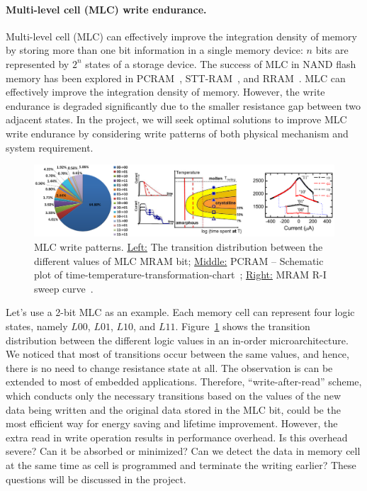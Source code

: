\paragraph{Multi-level cell (MLC) write endurance.} Multi-level cell (MLC) can effectively improve the integration density of memory by storing more than one bit information in a single memory device: $n$ bits are represented by  $2^n$ states of a storage device. The success of MLC in NAND flash memory has been explored in PCRAM~\cite{Raoux08,Bedeschi09}, STT-RAM~\cite{Lou08}, and RRAM~\cite{Baek05}. MLC can effectively improve the integration density of memory. However, the write endurance is degraded significantly due to the smaller resistance gap between two adjacent states. In the project, we will seek optimal solutions to improve MLC write endurance by considering write patterns of both physical mechanism and system requirement.

\begin{figure}
\centering
\vspace{-10pt}
\includegraphics[width=1.0\textwidth]{./figure/4_mlc.pdf}
\vspace{-10pt}
\caption{MLC write patterns. \underline{Left:} The transition distribution between the different values of MLC MRAM bit; \underline{Middle:} PCRAM -- Schematic plot of time-temperature-transformation-chart~\cite{Nirschl07}; \underline{Right:} MRAM R-I sweep curve~\cite{Lou08}.}
\label{mlc}
\vspace{-10pt}
\end{figure}

Let's use a 2-bit MLC as an example. Each memory cell can represent four logic states, namely $L00$, $L01$, $L10$, and $L11$.  Figure~\ref{mlc} shows the transition distribution between the different logic values in an in-order microarchitecture. We noticed that most of transitions occur between the same values, and hence, there is no need to change resistance state at all. The observation is can be extended to most of embedded applications. Therefore, ``write-after-read'' scheme, which conducts only the necessary transitions based on the values of the new data being written and the original data stored in the MLC bit, could be the most efficient way for energy saving and lifetime improvement. However, the extra read in write operation results in performance overhead. Is this overhead severe? Can it be absorbed or minimized? Can we detect the data in memory cell at the same time as cell is programmed and terminate the writing earlier? These questions will be discussed in the project.

